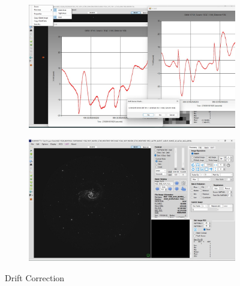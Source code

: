 \documentclass[12pt]{report}
\begin{document}
\begin{figure}[htbp]
    \centering

    \begin{subfigure}{0.45\textwidth}
        \centering
        \includegraphics[width=\linewidth]{image28.png}
        \label{fig:image28}
    \end{subfigure}
    \hfill
    \begin{subfigure}{0.45\textwidth}
        \centering
        \includegraphics[width=\linewidth]{image29.png}
        \label{fig:image29}
    \end{subfigure}
    \label{fig: image2829}
    \caption*{Drift Correction}



\end{figure}
\end{document}
